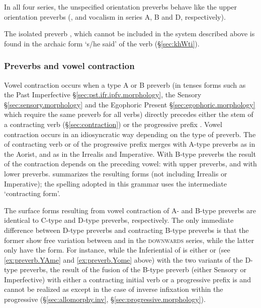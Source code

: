 In all four series, the unspecified orientation preverbs behave like the upper orientation preverbs (,  and  vocalism in series A, B and D, respectively).  

The isolated preverb , which cannot be included in the system described above  is found in the archaic form  `s/he said' of the verb  (§\ref{sec:khWti}).  

\subsubsection{Preverbs and vowel contraction} \label{sec:preverbs.contracting.verbs}
Vowel contraction occurs when a type A or B preverb (in tenses forms such as the  Past Imperfective §\ref{sec:pst.ifr.ipfv.morphology}, the  Sensory §\ref{sec:sensory.morphology} and the  Egophoric Present §\ref{sec:egophoric.morphology} which require the same preverb for all verbs) directly precedes either the stem of a contracting verb (§\ref{sec:contraction}) or the progressive prefix . Vowel contraction occurs in an idiosyncratic way depending on the type of preverb. The  of contracting verb or of the progressive prefix merges with A-type preverbs as   in the Aorist, and as  in the Irrealis and Imperative. With B-type preverbs the result of the contraction depends on the preceding vowel:  with upper  preverbs, and  with lower  preverbs.  summarizes the resulting forms (not including Irrealis or Imperative); the spelling adopted in this grammar uses the intermediate `contracting form'.

The surface forms resulting from vowel contraction of A- and B-type preverbs are identical to C-type and D-type preverbs, respectively. The only immediate difference between D-type preverbs and contracting B-type preverbs is that the former show free variation between  and  in the \textsc{downwards} series, while the latter only have the  form. For instance, while the Inferiential of  is either   or  (see \ref{ex:preverb.YAme} and \ref{ex:preverb.Yome} above) with the two variants of the D-type preverbs, the result of the fusion of the B-type preverb  (either Sensory or Imperfective) with either a contracting  initial verb or a progressive  prefix is   and cannot be realized as  except in the case of inverse  infixation within the progressive  (§\ref{sec:allomorphy.inv}, §\ref{sec:progressive.morphology}).

